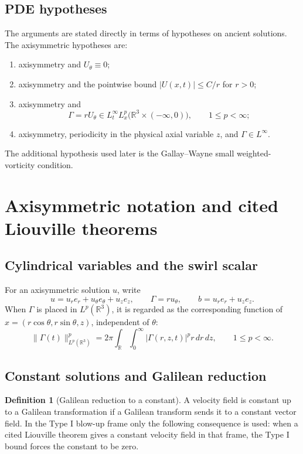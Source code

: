 \documentclass[11pt]{amsart}
\theoremstyle{plain}
\theoremstyle{definition}
\newtheorem{definition}[definition]{Definition}
\theoremstyle{remark}
\numberwithin{equation}{section}
\begin{document}
\subsection{PDE hypotheses}

The arguments are stated directly in terms of hypotheses on ancient
solutions.  The axisymmetric hypotheses are:
\begin{enumerate}[label=\textup{(\roman*)}]
\item axisymmetry and \(U_\theta\equiv0\);
\item axisymmetry and the pointwise bound \(|U(x,t)|\le C/r\) for \(r>0\);
\item axisymmetry and
\[
   \Gamma=rU_\theta\in L_t^\infty L_x^p
   \bigl(\mathbb R^3\times(-\infty,0)\bigr),
   \qquad 1\le p<\infty;
\]
\item axisymmetry, periodicity in the physical axial variable \(z\), and
\(\Gamma\in L^\infty\).
\end{enumerate}
The additional hypothesis used later is the Gallay--Wayne small
weighted-vorticity condition.

\section{Axisymmetric notation and cited Liouville theorems}
\label{p3:sec:axisymmetric-liouville-theorems}

\subsection{Cylindrical variables and the swirl scalar}

For an axisymmetric solution \(u\), write
\[
   u=u_re_r+u_\theta e_\theta+u_ze_z,\qquad
   \Gamma=ru_\theta,\qquad
   b=u_re_r+u_ze_z .
\]
When \(\Gamma\) is placed in \(L^p(\mathbb R^3)\), it is regarded as the
corresponding function of \(x=(r\cos\theta,r\sin\theta,z)\), independent of
\(\theta\):
\[
   \|\Gamma(t)\|_{L^p(\mathbb R^3)}^p
   =
   2\pi\int_{\mathbb R}\int_0^\infty
      |\Gamma(r,z,t)|^p r\,dr\,dz,\qquad 1\le p<\infty .
\]

\subsection{Constant solutions and Galilean reduction}

\begin{definition}[Galilean reduction to a constant]
A velocity field is constant up to a Galilean transformation if a Galilean
transform sends it to a constant vector field.  In the Type I blow-up frame
only the following consequence is used: when a cited Liouville theorem
gives a constant velocity field in that frame, the Type I bound forces the
constant to be zero.
\end{definition}
\end{document}
